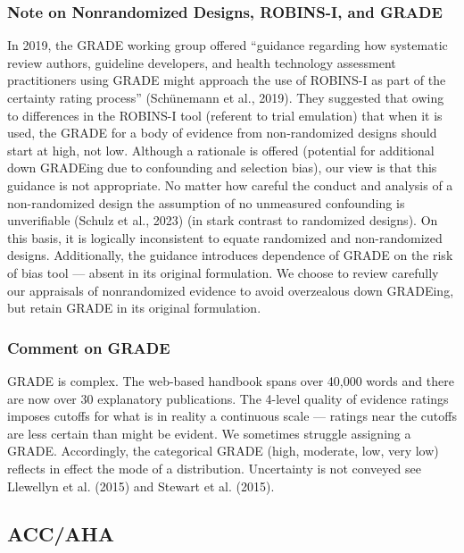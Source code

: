 \documentclass[
  letterpaper,
  DIV=11,
  numbers=noendperiod]{scrreprt}
\begin{document}
\hypertarget{note-on-nonrandomized-designs-robins-i-and-grade}{%
\subsubsection{Note on Nonrandomized Designs, ROBINS-I, and
GRADE}\label{note-on-nonrandomized-designs-robins-i-and-grade}}

In 2019, the GRADE working group offered ``guidance regarding how
systematic review authors, guideline developers, and health technology
assessment practitioners using GRADE might approach the use of ROBINS-I
as part of the certainty rating process'' (Schünemann et al., 2019).
They suggested that owing to differences in the ROBINS-I tool (referent
to trial emulation) that when it is used, the GRADE for a body of
evidence from non-randomized designs should start at high, not low.
Although a rationale is offered (potential for additional down GRADEing
due to confounding and selection bias), our view is that this guidance
is not appropriate. No matter how careful the conduct and analysis of a
non-randomized design the assumption of no unmeasured confounding is
unverifiable (Schulz et al., 2023) (in stark contrast to randomized
designs). On this basis, it is logically inconsistent to equate
randomized and non-randomized designs. Additionally, the guidance
introduces dependence of GRADE on the risk of bias tool --- absent in
its original formulation. We choose to review carefully our appraisals
of nonrandomized evidence to avoid overzealous down GRADEing, but retain
GRADE in its original formulation.

\hypertarget{comment-on-grade}{%
\subsubsection{Comment on GRADE}\label{comment-on-grade}}

GRADE is complex. The web-based handbook spans over 40,000 words and
there are now over 30 explanatory publications. The 4-level quality of
evidence ratings imposes cutoffs for what is in reality a continuous
scale --- ratings near the cutoffs are less certain than might be
evident. We sometimes struggle assigning a GRADE. Accordingly, the
categorical GRADE (high, moderate, low, very low) reflects in effect the
mode of a distribution. Uncertainty is not conveyed see Llewellyn et al.
(2015) and Stewart et al. (2015).

\hypertarget{accaha}{%
\subsection{ACC/AHA}\label{accaha}}
\end{document}
